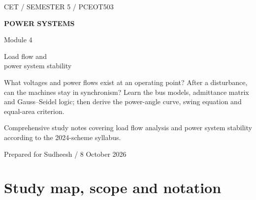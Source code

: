 \documentclass[11pt,a4paper]{article}
\newenvironment{Idea}[1]{\begin{tcolorbox}[colback=pale,colframe=teal,coltitle=white,title={#1}]}{\end{tcolorbox}}
\newcommand{\chapterstart}[2]{\par\needspace{12\baselineskip}\section{#1}\label{#2}}
\begin{document}
\begin{titlepage}
\vspace*{12mm}
{\small\sffamily\color{teal}CET / SEMESTER 5 / PCEOT503}\par\vspace{16mm}
{\Huge\sffamily\bfseries\color{ink}POWER SYSTEMS}\par\vspace{6mm}
{\huge\sffamily\color{teal}Module 4}\par\vspace{10mm}
{\LARGE\sffamily Load flow and\\power system stability}\par\vspace{13mm}
\par\vspace{13mm}
\begin{Idea}{Two questions, one connected understanding}
What voltages and power flows exist at an operating point? After a disturbance, can the machines stay in synchronism? Learn the bus models, admittance matrix and Gauss--Seidel logic; then derive the power-angle curve, swing equation and equal-area criterion.
\end{Idea}
\vfill
{\small Comprehensive study notes covering load flow analysis and power system stability according to the 2024-scheme syllabus.}\par\vspace{4mm}
{\small\sffamily Prepared for Sudheesh / 8 October 2026}
\end{titlepage}
\setcounter{tocdepth}{1}\tableofcontents\clearpage{}

\chapterstart{Study map, scope and notation}{map}
\end{document}

